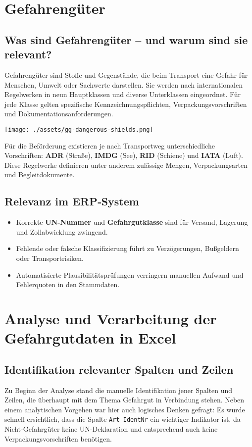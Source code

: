 \section{Gefahrengüter}
\subsection{Was sind Gefahrengüter – und warum sind sie relevant?}

Gefahrengüter sind Stoffe und Gegenstände, die beim Transport eine
Gefahr für Menschen, Umwelt oder Sachwerte darstellen. Sie werden nach
internationalen Regelwerken in neun Hauptklassen und diverse Unterklassen
eingeordnet. Für jede Klasse gelten spezifische Kennzeichnungspflichten,
Verpackungsvorschriften und Dokumentationsanforderungen.

\begin{center}
  \texttt{[image: ./assets/gg-dangerous-shields.png]}
\end{center}

Für die Beförderung existieren je nach Transportweg unterschiedliche Vorschriften:
\textbf{ADR} (Straße), \textbf{IMDG} (See), \textbf{RID} (Schiene) und \textbf{IATA} (Luft).
Diese Regelwerke definieren unter anderem zulässige Mengen, Verpackungsarten und
Begleitdokumente.

\subsection{Relevanz im ERP‐System}
\begin{itemize}
  \item Korrekte \textbf{UN-Nummer} und \textbf{Gefahrgutklasse} sind für
        Versand, Lagerung und Zollabwicklung zwingend.
  \item Fehlende oder falsche Klassifizierung führt zu
        Verzögerungen, Bußgeldern oder Transportrisiken.
  \item Automatisierte Plausibilitätsprüfungen verringern manuellen
        Aufwand und Fehlerquoten in den Stammdaten.
\end{itemize}


\section{Analyse und Verarbeitung der Gefahrgutdaten in Excel}

\subsection{Identifikation relevanter Spalten und Zeilen}
Zu Beginn der Analyse stand die manuelle Identifikation jener Spalten und Zeilen, die überhaupt mit dem 
Thema Gefahrgut in Verbindung stehen. Neben einem analytischen Vorgehen war hier auch logisches Denken gefragt: 
Es wurde schnell ersichtlich, dass die Spalte \texttt{Art\_IdentNr} ein wichtiger Indikator ist, 
da Nicht-Gefahrgüter keine UN-Deklaration und entsprechend auch keine Verpackungsvorschriften benötigen.

